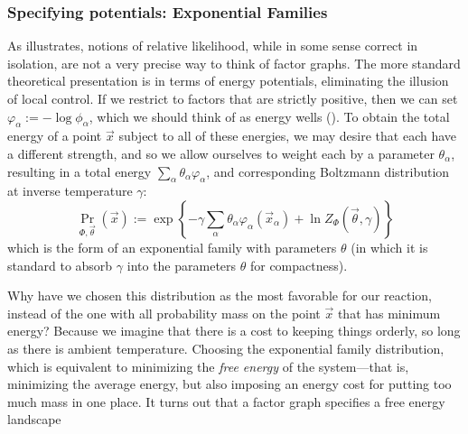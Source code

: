 \documentclass{article}
\numberwithin{equation}{section}
\begin{document}
	\subsubsection{Specifying potentials: Exponential Families}\label{sec:fg-expfam}
	As  illustrates, notions of relative likelihood, while in some sense correct in isolation, are not a very precise way to think of factor graphs. The more standard theoretical presentation is in terms of energy potentials, eliminating the illusion of local control.
	If we restrict to factors that are strictly positive, %
	then we can set $ \varphi_\alpha := -\log \phi_\alpha$, which we should think of as energy wells (). To obtain the total energy of a point $\vec x$ subject to all of these energies, we may desire that each have a different strength, and so we allow ourselves to weight each by a parameter $\theta_\alpha$, resulting in a total energy $\sum_\alpha \theta_\alpha \varphi_\alpha$,
	and corresponding Boltzmann distribution at inverse temperature $\gamma$:
	\[ \Pr_{\Phi, \vec\theta} (\vec x)  := \exp \left\{ -\gamma \sum_\alpha \theta_\alpha \varphi_\alpha(\vec x_\alpha)  + \ln Z_\Phi(\vec \theta, \gamma) \right\} \] 
	which is the form of an exponential family with parameters $\theta$ (in which it is standard to absorb $\gamma$ into the parameters $\theta$ for compactness).
	
	Why have we chosen this distribution as the most favorable for our reaction, instead of the one with all probability mass on the point $\vec x$ that has minimum energy? Because we imagine that there is a cost to keeping things orderly, so long as there is ambient temperature. Choosing the exponential family distribution, which is equivalent to minimizing the \emph{free energy} of the system---that is, minimizing the average energy, but also imposing an energy cost for putting too much mass in one place. It turns out that a factor graph specifies a free energy landscape
	
\end{document}
